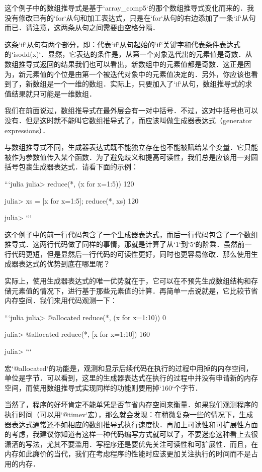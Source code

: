 这个例子中的数组推导式是基于`array_comp5`的那个数组推导式变化而来的．我没有修改已有的`for`从句和加工表达式，只是在`for`从句的右边添加了一条`if`从句而已．请注意，这两条从句之间需要由空格分隔．

这条`if`从句有两个部分，即：代表`if`从句起始的`if`关键字和代表条件表达式的`isodd(x)`．显然，它表达的条件是，从第一个对象迭代出的元素值是奇数．从数组推导式返回的结果我们也可以看出，新数组中的元素值都是奇数．这正是因为，新元素值的个位是由第一个被迭代对象中的元素值决定的．另外，你应该也看到了，新数组是一个一维的数组．实际上，只要加入了`if`从句，数组推导式的求值结果就只可能是一维数组．

我们在前面说过，数组推导式在最外层会有一对中括号．不过，这对中括号也可以没有．但是这时就不能叫它数组推导式了，而应该叫做生成器表达式（generator expressions）．

与数组推导式不同，生成器表达式既不能独立存在也不能被赋给某个变量．它只能被作为参数值传入某个函数．为了避免歧义和提高可读性，我们总是应该用一对圆括号包裹生成器表达式．请看下面的示例：

```julia
julia> reduce(*, (x for x=1:5))
120

julia> xs = [x for x=1:5]; reduce(*, xs)
120

julia> 
```

这个例子中的前一行代码包含了一个生成器表达式，而后一行代码包含了一个数组推导式．这两行代码做了同样的事情，那就是计算了从`1`到`5`的阶乘．虽然前一行代码更短，但是显然后一行代码的可读性更好，同时也更容易修改．那么使用生成器表达式的优势到底在哪里呢？

实际上，使用生成器表达式的唯一优势就在于，它可以在不预先生成数组结构和存储元素值的情况下，进行基于那些元素值的计算．再简单一点说就是，它比较节省内存空间．我们来用代码观测一下：

```julia
julia> @allocated reduce(*, (x for x=1:10))
0

julia> @allocated reduce(*, [x for x=1:10])
160

julia> 
```

宏`@allocated`的功能是，观测和显示后续代码在执行的过程中用掉的内存空间，单位是字节．可以看到，这里的生成器表达式在执行的过程中并没有申请新的内存空间，而使用数组推导式实现同样的功能则要用掉`160`个字节．

当然了，程序的好坏肯定不能单凭是否节省内存空间来衡量．如果我们观测程序的执行时间（可以用`@timev`宏），那么就会发现：在稍微复杂一些的情况下，生成器表达式通常还不如相应的数组推导式执行速度快．再加上可读性和可扩展性方面的考虑，我建议你知道有这样一种代码编写方式就可以了，不要迷恋这种看上去很潇洒的写法，尤其不要滥用．写程序还是要优先关注可读性和可扩展性．而且，在内存如此廉价的当代，我们在考虑程序的性能时应该更加关注执行的时间而不是占用的内存．

